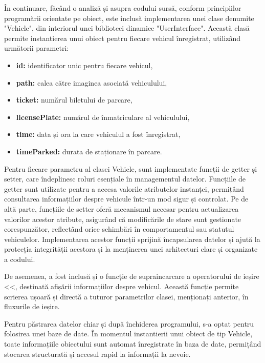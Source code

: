 \documentclass[a4paper,12pt]{report}
\begin{document}
În continuare, făcând o analiză și asupra codului sursă, conform principiilor programării orientate pe obiect, este inclusă implementarea unei clase denumite "Vehicle", din interiorul unei biblioteci dinamice "UserInterface". Această clasă permite instantierea unui obiect pentru fiecare vehicul înregistrat, utilizând următorii parametri:

\begin{itemize}
    \item \textbf{id:} identificator unic pentru fiecare vehicul,
    \item \textbf{path:} calea către imaginea asociată vehiculului,
    \item \textbf{ticket:} numărul biletului de parcare,
    \item \textbf{licensePlate:} numărul de înmatriculare al vehiculului,
    \item \textbf{time:} data și ora la care vehiculul a fost înregistrat,
    \item \textbf{timeParked:} durata de staționare în parcare.
\end{itemize}

Pentru fiecare parametru al clasei Vehicle, sunt implementate funcții de getter și setter, care îndeplinesc roluri esențiale în managementul datelor. Funcțiile de getter sunt utilizate pentru a accesa valorile atributelor instanței, permițând consultarea informațiilor despre vehicule într-un mod sigur și controlat. Pe de altă parte, funcțiile de setter oferă mecanismul necesar pentru actualizarea valorilor acestor atribute, asigurând că modificările de stare sunt gestionate corespunzător, reflectând orice schimbări în comportamentul sau statutul vehiculelor. Implementarea acestor funcții sprijină încapsularea datelor și ajută la protecția integrității acestora și la menținerea unei arhitecturi clare și organizate a codului.

De asemenea, a fost inclusă și o funcție de supraincarcare a operatorului de ieșire <<, destinată afișării informațiilor despre vehicul. Această funcție permite scrierea ușoară și directă a tuturor parametrilor clasei, menționați anterior, în fluxurile de ieșire.

Pentru păstrarea datelor chiar și după închiderea programului, s-a optat pentru folosirea unei baze de date. În momentul instantierii unui obiect de tip Vehicle, toate informațiile obiectului sunt automat înregistrate în baza de date, permițând stocarea structurată și accesul rapid la informații la nevoie.
\end{document}
